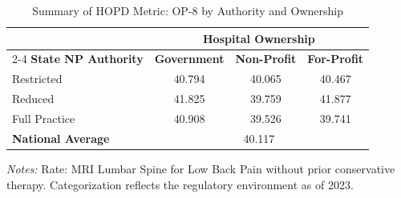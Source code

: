 \begin{table}[htbp]
    \centering
    \caption{Summary of HOPD Metric: OP-8 by Authority and Ownership}
    \label{tab:hopd_op_8_own}
    \vspace{0.2cm}
    \begin{tabular}{lccc}
        \toprule
        & \multicolumn{3}{c}{\textbf{Hospital Ownership}} \\
        \cmidrule(lr){2-4}
        \textbf{State NP Authority} & \textbf{Government} & \textbf{Non-Profit} & \textbf{For-Profit} \\
        \midrule
        Restricted & 40.794 & 40.065 & 40.467 \\
        Reduced & 41.825 & 39.759 & 41.877 \\
        Full Practice & 40.908 & 39.526 & 39.741 \\
        \midrule
        \textbf{National Average} & \multicolumn{3}{c}{40.117} \\
        \bottomrule
    \end{tabular}
    \vspace{0.1cm}
    \begin{minipage}{0.85\textwidth}
        \footnotesize \textit{Notes:} Rate: MRI Lumbar Spine for Low Back Pain without prior conservative therapy. Categorization reflects the regulatory environment as of 2023.
    \end{minipage}
\end{table}